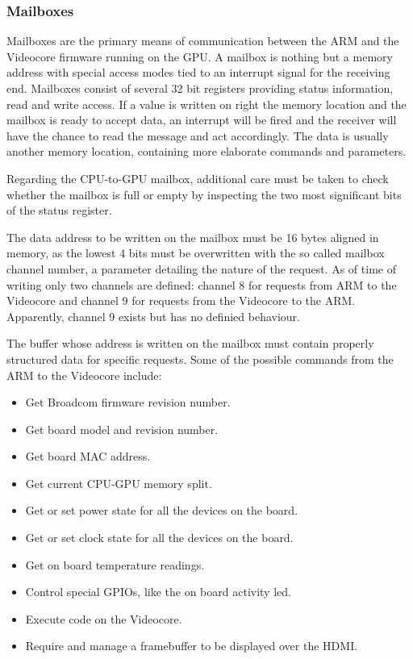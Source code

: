 \documentclass[12pt,a4paper,openright,twoside]{report}
\begin{document}
\subsubsection{Mailboxes}
Mailboxes are the primary means of communication between the ARM and the 
Videocore firmware running on the GPU. A mailbox is nothing but a memory address
with special access modes tied to an interrupt signal for the receiving end.
Mailboxes consist of several 32 bit registers providing status information, read
and write access. If a value is written on right the memory location and the
mailbox is ready to accept data, an interrupt will be fired and the receiver
will have the chance to read the message and act accordingly. The data is 
usually another memory location, containing more elaborate commands and parameters.

Regarding the CPU-to-GPU mailbox, additional care must be taken to check whether
the mailbox is full or empty by inspecting the two most significant bits of 
the status register.

The data address to be written on the mailbox must be 16 bytes aligned in memory,
as the lowest 4 bits must be overwritten with the so called mailbox channel
number, a parameter detailing the nature of the request. As of time of writing
only two channels are defined: channel 8 for requests from ARM to the Videocore
and channel 9 for requests from the Videocore to the ARM. Apparently, channel 9
exists but has no definied behaviour.

The buffer whose address is written on the mailbox must contain properly structured
data for specific requests. Some of the possible commands from the ARM to the
Videocore include:
\begin{itemize}
    \item Get Broadcom firmware revision number.
    \item Get board model and revision number.
    \item Get board MAC address.
    \item Get current CPU-GPU memory split.
    \item Get or set power state for all the devices on the board.
    \item Get or set clock state for all the devices on the board.
    \item Get on board temperature readings.
    \item Control special GPIOs, like the on board activity led.
    \item Execute code on the Videocore.
    \item Require and manage a framebuffer to be displayed over the HDMI.
\end{itemize}
\end{document}

